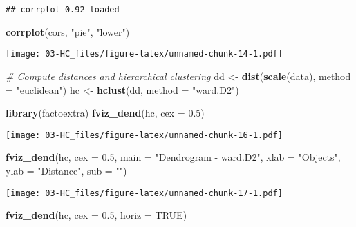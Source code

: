\documentclass[
]{elegantbook}
\newenvironment{Shaded}{\begin{snugshade}}{\end{snugshade}}
\newcommand{\AttributeTok}[1]{\textcolor[rgb]{0.13,0.29,0.53}{#1}}
\newcommand{\CommentTok}[1]{\textcolor[rgb]{0.56,0.35,0.01}{\textit{#1}}}
\newcommand{\ConstantTok}[1]{\textcolor[rgb]{0.56,0.35,0.01}{#1}}
\newcommand{\FloatTok}[1]{\textcolor[rgb]{0.00,0.00,0.81}{#1}}
\newcommand{\FunctionTok}[1]{\textcolor[rgb]{0.13,0.29,0.53}{\textbf{#1}}}
\newcommand{\NormalTok}[1]{#1}
\newcommand{\OtherTok}[1]{\textcolor[rgb]{0.56,0.35,0.01}{#1}}
\newcommand{\StringTok}[1]{\textcolor[rgb]{0.31,0.60,0.02}{#1}}
\begin{document}
\begin{verbatim}
## corrplot 0.92 loaded
\end{verbatim}

\begin{Shaded}
\begin{Highlighting}[]
\FunctionTok{corrplot}\NormalTok{(cors, }\StringTok{"pie"}\NormalTok{, }\StringTok{"lower"}\NormalTok{)}
\end{Highlighting}
\end{Shaded}

\texttt{[image: 03-HC\_files/figure-latex/unnamed-chunk-14-1.pdf]}

\begin{Shaded}
\begin{Highlighting}[]
\CommentTok{\# Compute distances and hierarchical clustering}
\NormalTok{dd }\OtherTok{\textless{}{-}} \FunctionTok{dist}\NormalTok{(}\FunctionTok{scale}\NormalTok{(data), }\AttributeTok{method =} \StringTok{"euclidean"}\NormalTok{)}
\NormalTok{hc }\OtherTok{\textless{}{-}} \FunctionTok{hclust}\NormalTok{(dd, }\AttributeTok{method =} \StringTok{"ward.D2"}\NormalTok{)}
\end{Highlighting}
\end{Shaded}

\begin{Shaded}
\begin{Highlighting}[]
\FunctionTok{library}\NormalTok{(factoextra)}
\FunctionTok{fviz\_dend}\NormalTok{(hc, }\AttributeTok{cex =} \FloatTok{0.5}\NormalTok{)}
\end{Highlighting}
\end{Shaded}

\texttt{[image: 03-HC\_files/figure-latex/unnamed-chunk-16-1.pdf]}

\begin{Shaded}
\begin{Highlighting}[]
\FunctionTok{fviz\_dend}\NormalTok{(hc, }\AttributeTok{cex =} \FloatTok{0.5}\NormalTok{,}
\AttributeTok{main =} \StringTok{"Dendrogram {-} ward.D2"}\NormalTok{,}
\AttributeTok{xlab =} \StringTok{"Objects"}\NormalTok{, }\AttributeTok{ylab =} \StringTok{"Distance"}\NormalTok{, }\AttributeTok{sub =} \StringTok{""}\NormalTok{)}
\end{Highlighting}
\end{Shaded}

\texttt{[image: 03-HC\_files/figure-latex/unnamed-chunk-17-1.pdf]}

\begin{Shaded}
\begin{Highlighting}[]
\FunctionTok{fviz\_dend}\NormalTok{(hc, }\AttributeTok{cex =} \FloatTok{0.5}\NormalTok{, }\AttributeTok{horiz =} \ConstantTok{TRUE}\NormalTok{)}
\end{Highlighting}
\end{Shaded}
\end{document}
